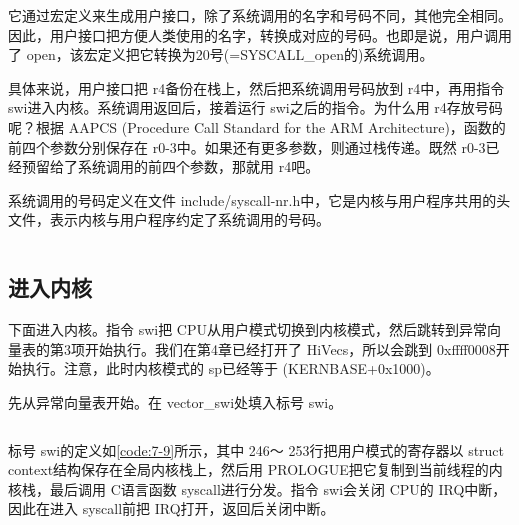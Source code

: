 \documentclass[main.tex]{subfiles}
\begin{document}
\begin{CJK*}{UTF8}{song}
\begin{code}
\label{code:7-6}
\inputminted[linenos,numbersep=5pt,frame=lines,framesep=2mm]{gas}{src/chapter07/userapp/lib/syscall-wrapper.S}
\end{code}

它通过宏定义来生成用户接口，除了系统调用的名字和号码不同，其他完全相同。因此，用户接口把方便人类使用的名字，转换成对应的号码。也即是说，用户调用了 open，该宏定义把它转换为20号(=SYS\-CALL\_\-open的)系统调用。

\par
具体来说，用户接口把 r4备份在栈上，然后把系统调用号码放到 r4中，再用指令 swi进入内核。系统调用返回后，接着运行 swi之后的指令。为什么用 r4存放号码呢？根据 AAPCS (Procedure Call Standard for the ARM Architecture)，函数的前四个参数分别保存在 r0-3中。如果还有更多参数，则通过栈传递。既然 r0-3已经预留给了系统调用的前四个参数，那就用 r4吧。

\par
系统调用的号码定义在文件 include/syscall-nr.h中，它是内核与用户程序共用的头文件，表示内核与用户程序约定了系统调用的号码。

\begin{code}
\label{code:7-7}
\inputminted[firstline=23,lastline=35,linenos,numbersep=5pt,frame=lines,framesep=2mm]{c}{src/chapter07/include/syscall-nr.h}
\end{code}

\subsection{进入内核}
下面进入内核。指令 swi把 CPU从用户模式切换到内核模式，然后跳转到异常向量表的第3项开始执行。我们在第4章已经打开了 Hi\-Vecs，所以会跳到 0xffff\-0008开始执行。注意，此时内核模式的 sp已经等于 (KER\-NBASE\-+0x1000)。

\par
先从异常向量表开始。在 vector\_swi处填入标号 swi。

\begin{code}
\label{code:7-8}
\inputminted[firstline=131,lastline=156,linenos,numbersep=5pt,frame=lines,framesep=2mm]{gas}{src/chapter07/kernel/entry.S}
\end{code}

标号 swi的定义如\ref{code:7-9}所示，其中 246～ 253行把用户模式的寄存器以 struct context结构保存在全局内核栈上，然后用 PRO\-LOGUE把它复制到当前线程的内核栈，最后调用 C语言函数 syscall进行分发。指令 swi会关闭 CPU的 IRQ中断，因此在进入 syscall前把 IRQ打开，返回后关闭中断。


\end{CJK*}
\end{document}
